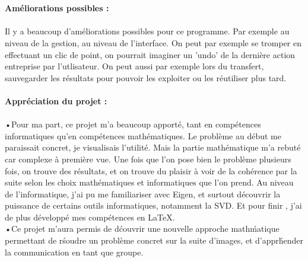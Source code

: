 \documentclass[a4paper,11pt,fleqn]{report}
\begin{document}
	\\\\
	\textbf{Am\'eliorations possibles :}\\\\
	Il y a beaucoup d'am\'eliorations possibles pour ce programme. Par exemple au niveau de la gestion, au niveau de l'interface. On peut par exemple se tromper en effectuant un clic de point, on pourrait imaginer un 'undo' de la derni\`ere action entreprise par l'utlisateur.
	On peut aussi par exemple lors du transfert, sauvegarder les r\'esultats pour pouvoir les exploiter ou les r\'eutiliser plus tard.
	\\
	\\
	\textbf{Appr\'eciation du projet :}\\\\
	•Pour ma part, ce projet m'a beaucoup apport\'e, tant en comp\'etences informatiques qu'en comp\'etences math\'ematiques. Le probl\`eme au d\'ebut me paraissait concret, je visualisais l'utilit\'e. Mais la partie math\'ematique m'a rebut\'e car complexe \`a premi\`ere vue. Une fois que l'on pose bien le probl\`eme plusieurs fois, on trouve des r\'esultats, et on trouve du plaisir \`a voir de la coh\'erence par la suite selon les choix math\'ematiques et informatiques que l'on prend. Au niveau de l'informatique, j'ai pu me familiariser avec Eigen, et surtout d\'ecouvrir la puissance de certains outils informatiques, notamment la SVD. Et pour finir , j'ai de plus d\'evelopp\'e mes comp\'etences en \LaTeX.\\
	•Ce projet m'aura permis de d\'couvrir une nouvelle approche math\'matique permettant de r\'soudre un probl\`eme concret sur la suite d'images, et d'appr\'hender la communication en tant que groupe.
	
	
\end{document}

